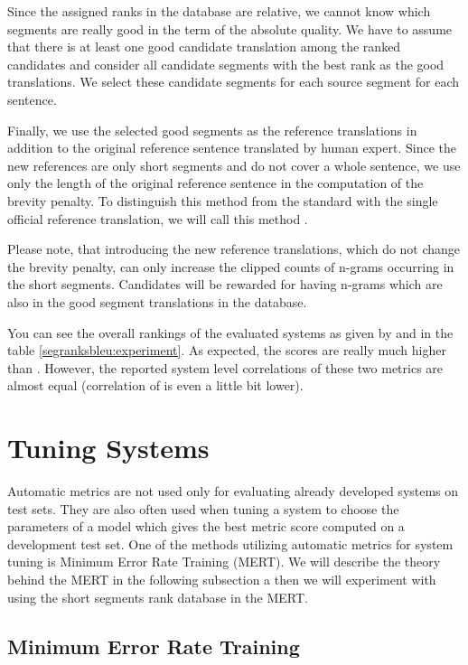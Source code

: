 Since the assigned ranks in the database are relative, we cannot know which
segments are really good in the term of the absolute quality. We have to assume
that there is at least one good candidate translation among the ranked
candidates and consider all candidate segments with the best rank as the good
translations. We select these candidate segments for each source segment for
each sentence.

Finally, we use the selected good segments as the reference translations in
addition to the original reference sentence translated by human expert.  Since
the new references are only short segments and do not cover a whole sentence,
we use only the length of the original reference sentence in the computation of
the brevity penalty. To distinguish this method from the standard 
with the single official reference translation, we will call this method
.

Please note, that introducing the new reference
translations, which do not change the brevity penalty, can only increase the
clipped counts of n-grams occurring in the short segments.  Candidates will be
rewarded for having n-grams which are also in the good segment translations in
the database.

You can see the overall rankings of the evaluated systems as given by
 and  in the table
\ref{segranksbleu:experiment}. As expected, the  scores
are really much higher than . However, the reported system level
correlations of these two metrics are almost equal (correlation of
 is even a little bit lower).  


\section{Tuning Systems}
\label{tuning-systems}

Automatic metrics are not used only for evaluating already developed systems on
test sets. They are also often used when tuning a system to choose the
parameters of a model which gives the best metric score computed on a
development test set. One of the methods utilizing automatic metrics for system
tuning is Minimum Error Rate Training (MERT). We will describe the theory
behind the MERT in the following subsection a then we will experiment with
using the short segments rank database in the MERT.

\subsection{Minimum Error Rate Training}

